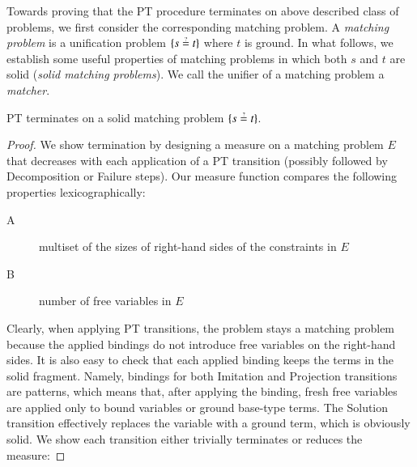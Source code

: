 Towards proving that the PT
procedure terminates on above described class of problems, we first consider the corresponding matching problem.
A \emph{matching problem} is a unification problem
$\{ s \unif t \}$ where $t$ is ground. In what
follows, we establish some useful properties of matching problems in which both
$s$ and $t$ are solid (\emph{solid matching problems}). We call the unifier
of a matching problem a \emph{matcher}.

\begin{lemma}
    \label{unif:lemma:pt-matching-termination}
    PT terminates on a solid matching problem $\{s \unif t\}$.
\end{lemma}
\begin{proof}
    We show termination by designing a measure on a matching problem $E$ that
    decreases with each application of a PT transition (possibly followed by
    \textsf{Decomposition} or \textsf{Failure} steps). 
    Our measure function
    compares the following properties lexicographically:
    \begin{description}
        \item[A] multiset of the sizes of right-hand sides of the constraints in $E$
        \item[B] number of free variables in $E$
    \end{description}

    Clearly, when applying PT transitions, the problem stays a matching problem
    because the applied bindings do not introduce free variables on the
    right-hand sides. It is also easy to check that each applied binding keeps
    the terms in the solid fragment. Namely, bindings for both
    \textsf{Imitation} and \textsf{Projection} transitions are patterns, which means
    that, after applying the binding, fresh free variables are applied only to
    bound variables or ground base-type terms. The \textsf{Solution} transition effectively
    replaces the variable with a ground term, which is obviously solid. We show each transition 
    either trivially terminates or reduces the measure:


\end{proof}
